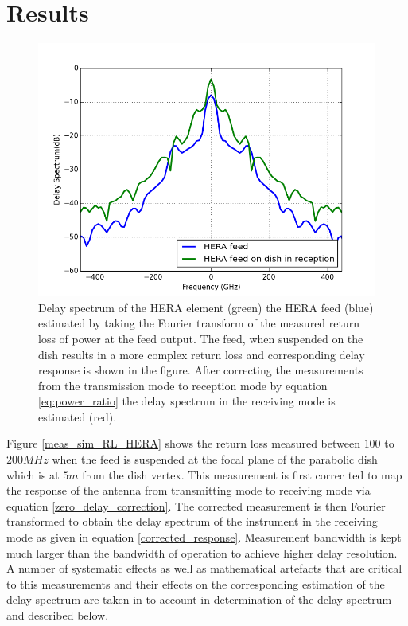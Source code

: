 \documentclass[twocolumn]{emulateapj}
\begin{document}
\section{Results}
\begin{figure}       
\centering
\includegraphics[width=\linewidth]{plots/H_dish_feed.png}
\caption{Delay spectrum of the HERA element (green) the HERA feed (blue) estimated by taking the Fourier transform of the measured return loss of power at the feed output. The feed, when suspended on the dish results in a more complex return loss and corresponding delay response is shown in the figure. After correcting the measurements from the transmission mode to reception mode by equation \ref{eq:power_ratio} the delay spectrum in the receiving mode is estimated (red). }
\label{fig:delay_spectrum}
\end{figure}

Figure \ref{meas_sim_RL_HERA} shows the return loss measured between $100$ to
$200MHz$ when the feed is suspended at the focal plane of the parabolic dish which is at $5m$ from the dish vertex. This measurement is first correc ted to map the response of the antenna from transmitting mode to receiving mode via equation \ref{zero_delay_correction}. The corrected measurement is then Fourier transformed to obtain the delay spectrum of the instrument in the receiving mode as given in equation \ref{corrected_response}. Measurement bandwidth is kept much larger than the bandwidth of operation to achieve higher delay resolution. A number of systematic effects as well as mathematical artefacts that are critical to this measurements and their effects on the corresponding estimation of the delay spectrum are taken in to account in determination of the delay spectrum and described below. 
\end{document}
